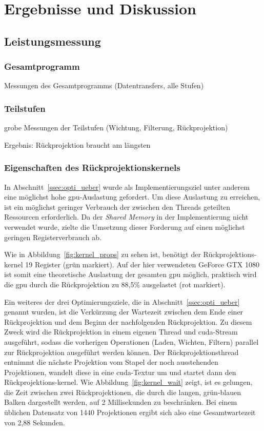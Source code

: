 \chapter{Ergebnisse und Diskussion}

\section{Leistungsmessung}

\subsection{Gesamtprogramm}

Messungen des Gesamtprogramms (Datentransfers, alle Stufen)

\subsection{Teilstufen}

grobe Messungen der Teilstufen (Wichtung, Filterung, Rückprojektion)

Ergebnis: Rückprojektion braucht am längsten

\subsection{Eigenschaften des Rückprojektionskernels}

In Abschnitt~\ref{ssec:opti_ueber} wurde als Implementierungsziel unter anderem eine möglichst hohe \gls{gpu}-Auslastung
gefordert. Um diese Auslastung zu erreichen, ist ein möglichst geringer Verbrauch der zwischen den Threads geteilten
Ressourcen erforderlich. Da der \textit{Shared Memory} in der Implementierung nicht verwendet wurde, zielte die
Umsetzung dieser Forderung auf einen möglichst geringen Registerverbrauch ab.

Wie in Abbildung~\ref{fig:kernel_props} zu sehen ist, benötigt der Rückprojektions-\gls{kernel} 19 Register
(grün markiert). Auf der hier verwendeten GeForce GTX 1080 ist somit eine theoretische Auslastung der gesamten \gls{gpu}
möglich, praktisch wird die \gls{gpu} durch die Rückprojektion zu 88,5\% ausgelastet (rot markiert).

Ein weiteres der drei Optimierungsziele, die in Abschnitt~\ref{ssec:opti_ueber} genannt wurden, ist die Verkürzung der
Wartezeit zwischen dem Ende einer Rückprojektion und dem Beginn der nachfolgenden Rückprojektion. Zu diesem Zweck wird
die Rückprojektion in einem eigenen Thread und \gls{cuda}-Stream ausgeführt, sodass die vorherigen Operationen (Laden,
Wichten, Filtern) parallel zur Rückprojektion ausgeführt werden können. Der Rückprojektionsthread entnimmt die nächste
Projektion vom Stapel der noch ausstehenden Projektionen, wandelt diese in eine \gls{cuda}-Textur um und startet dann
den Rückprojektions-\gls{kernel}. Wie Abbildung~\ref{fig:kernel_wait} zeigt, ist es gelungen, die Zeit zwischen zwei
Rückprojektionen, die durch die langen, grün-blauen Balken dargestellt werden, auf 2 Millisekunden zu beschränken. Bei
einem üblichen Datensatz von 1440 Projektionen ergibt sich also eine Gesamtwartezeit von 2,88 Sekunden.

